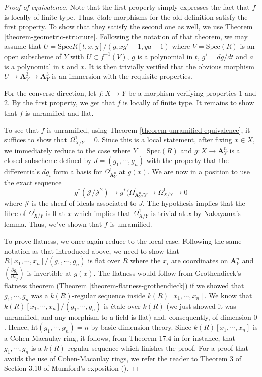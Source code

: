\begin{proof}[Proof of equivalence]
Note that the first property simply expresses the fact that $f$ is locally of
finite type. Thus, \'etale morphisms for the old definition satisfy the first
property. To show that they satisfy the second one as well, we use Theorem
\ref{theorem-geometric-structure}. Following the notation of that theorem,
we may assume that $U = \text{Spec}  R[t, x, y]/(g, xg' - 1, ya - 1)$ where
$V = \text{Spec}(R)$ is an open subscheme of $Y$ with $U \subset f^{-1}(V)$, $g$
is a polynomial in $t$, $g' = dg/dt$ and $a$ is a polynomial in $t$ and $x$.
It is then trivially verified that the obvious morphism
$U \to \mathbf{A}^3_V \to \mathbf{A}^3_Y$ is an immersion with the requisite
properties.

\medskip\noindent
For the converse direction, let $f : X \to Y$ be a morphism verifying properties
$1$ and $2$. By the first property, we get that $f$ is locally of finite type.
It remains to show that $f$ is unramified and flat.

\medskip\noindent
To see that $f$ is unramified, using Theorem
\ref{theorem-unramified-equivalence}, it suffices to show that
$\Omega^1_{X/Y} = 0$. Since this is a local statement, after fixing $x \in X$,
we immediately reduce to the case where $Y = \text{Spec}(R)$ and $g : X \to
\mathbf{A}^n_Y$ is
a closed subscheme defined by $J = (g_1, \cdots, g_n)$ with the property that
the differentials $dg_i$ form a basis for $\Omega^1_{\mathbf{A}^n_Y}$ at
$g(x)$. We
are now in a position to use the exact sequence
$$
g^*(\mathcal{J}/\mathcal{J}^2) \to g^*(\Omega^1_{\mathbf{A}^n_Y/Y} \to
\Omega^1_{X/Y} \to 0
$$
where $\mathcal{J}$ is the sheaf of ideals associated to $J$. The hypothesis
implies
that the fibre of $\Omega^1_{X/Y}$ is $0$ at $x$ which implies that
$\Omega^1_{X/Y}$ is trivial at $x$ by Nakayama's lemma. Thus, we've shown
that $f$ is unramified.

\medskip\noindent
To prove flatness, we once again reduce to the local case. Following the
same notation as that introduced above, we need to show that
$R[x_1, \cdots, x_n]/(g_1, \cdots, g_n)$ is flat over $R$ where the $x_i$ are
coordinates on $\mathbf{A}^n_Y$ and $(\frac{\partial g_i}{\partial x_j})$ is
invertible at $g(x)$. The flatness would follow from Grothendieck's flatness
theorem (Theorem \ref{theorem-flatness-grothendieck}) if we showed that
$g_1, \cdots, g_n$ was a $k(R)$-regular sequence inside
$k(R)[x_1, \cdots, x_n]$. We know that
$k(R)[x_1, \cdots, x_n]/(g_1, \cdots, g_n)$
is \'etale over $k(R)$ (we just showed it was unramified, and any morphism to
a field is flat) and, consequently, of dimension $0$. Hence,
$\mathrm{ht}(g_1, \cdots, g_n) = n$ by basic dimension theory. Since
$k(R)[x_1, \cdots, x_n]$ is a Cohen-Macaulay ring, it follows, from Theorem
17.4 in \cite{Ma} for instance, that $g_1, \cdots, g_n$ is a $k(R)$-regular
sequence which finishes the proof. For a proof that avoids the use of
Cohen-Macaulay rings, we refer the reader to Theorem 3 of Section 3.10 of
Mumford's exposition (\cite{RB}).
\end{proof}

